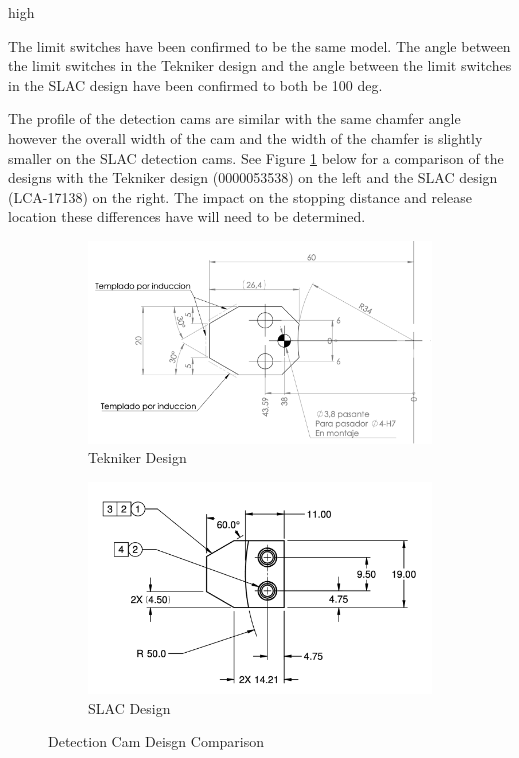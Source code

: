 high\documentclass[SE,lsstdraft,authoryear,toc]{lsstdoc}
\begin{document}
The limit switches have been confirmed to be the same model. The angle
between the limit switches in the Tekniker design and the angle between
the limit switches in the SLAC design have been confirmed to both be 100
deg.

The profile of the detection cams are similar with the same chamfer
angle however the overall width of the cam and the width of the chamfer
is slightly smaller on the SLAC detection cams. See Figure \ref{fig:Figure_4} below for a
comparison of the designs with the Tekniker design (0000053538) on the
left and the SLAC design (LCA-17138) on the right. The impact on the
stopping distance and release location these differences have will need
to be determined.

\begin{figure}[h!]
  \centering
  \begin{subfigure}{0.45\linewidth}
    \centering
    \includegraphics[width=\linewidth]{media/teknikerDrawing.png}
    \caption{Tekniker Design}
  \end{subfigure}
  \begin{subfigure}{0.45\linewidth}
    \centering
    \includegraphics[width=\linewidth]{media/slacDrawing.png}
    \caption{SLAC Design}
  \end{subfigure}
  \caption{Detection Cam Deisgn Comparison}
  \label{fig:Figure_4}
\end{figure}
\end{document}
